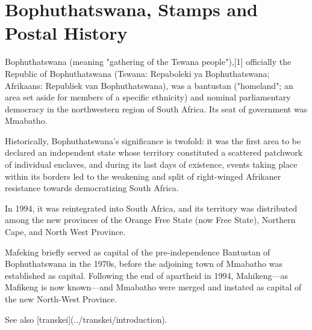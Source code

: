 
\section{Bophuthatswana, Stamps and Postal History}

Bophuthatswana (meaning "gathering of the Tswana people"),[1] officially the 
Republic of Bophuthatswana (Tswana: Repaboleki ya Bophuthatswana; Afrikaans: 
Republiek van Bophuthatswana), was a bantustan ("homeland"; an area set aside for members of a specific ethnicity) and nominal parliamentary democracy in the 
northwestern 
region of South Africa. Its seat of government was Mmabatho.

Historically, Bophuthatswana's significance is twofold: it was the first area to be declared an independent state whose territory constituted a scattered patchwork of individual enclaves, and during its last days of existence, events taking place 
within its borders led to the weakening and split of right-winged Afrikaner 
resistance towards democratizing South Africa.

In 1994, it was reintegrated into South Africa, and its territory was distributed 
among the new provinces of the Orange Free State (now Free State), Northern 
Cape, and North West Province.


Mafeking briefly served as capital of the pre-independence Bantustan of Bophuthatswana in the 1970s, before the adjoining town of Mmabatho was established as capital.
Following the end of apartheid in 1994, Mahikeng---as Mafikeng is now known---and Mmabatho were merged and instated as capital of the new North-West Province.

See also [transkei](../transkei/introduction).

                                                